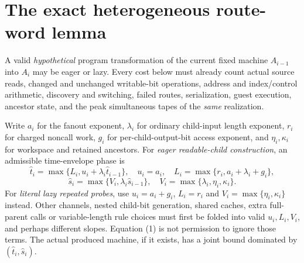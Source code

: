 \documentclass[11pt]{article}
\begin{document}
\section{The exact heterogeneous route-word lemma}
A valid \emph{hypothetical} program transformation of the
current fixed machine $A_{i-1}$ into $A_i$ may be eager or lazy.
Every cost below must already count actual source reads,
changed and unchanged writable-bit operations,
address and index/control arithmetic, discovery and switching,
failed routes, serialization, guest execution, ancestor state,
and the peak simultaneous tapes of the \emph{same} realization.

Write $a_i$ for the fanout exponent, $\lambda_i$ for ordinary
child-input length exponent, $r_i$ for charged noncall work,
$g_i$ for per-child-output-bit access exponent,
and $\eta_i,\kappa_i$ for workspace and retained ancestors.
For \emph{eager readable-child construction}, an admissible
time-envelope phase is
\[
 \widehat t_i=\max\{L_i,u_i+\lambda_i\widehat t_{i-1}\},
 \quad u_i=a_i,\quad
 L_i=\max\{r_i,a_i+\lambda_i+g_i\},
\]
\[
 \widehat s_i=\max\{V_i,\lambda_i\widehat s_{i-1}\},
 \quad V_i=\max\{\lambda_i,\eta_i,\kappa_i\}.
\tag{1}
\]
For \emph{literal lazy repeated probes}, use
$u_i=a_i+g_i$, $L_i=r_i$ and
$V_i=\max\{\eta_i,\kappa_i\}$ instead.
Other channels, nested child-bit generation, shared caches,
extra full-parent calls or variable-length rule choices must first
be folded into valid $u_i,L_i,V_i$, and perhaps different slopes.
Equation (1) is not permission to ignore those terms.
The actual produced machine, if it exists,
has a joint bound dominated by $(\widehat t_i,\widehat s_i)$.
\end{document}
